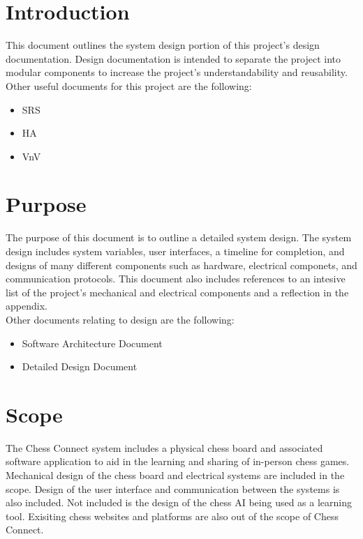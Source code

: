 \documentclass[12pt, titlepage]{article}
\begin{document}
\section{Introduction}
This document outlines the system design portion of this project's design documentation. Design documentation 
is intended to separate the project into modular components to increase the project's understandability and reusability. \\
Other useful documents for this project are the following:
\begin{itemize}
  \item SRS
  \item HA
  \item VnV
\end{itemize}

\section{Purpose}
The purpose of this document is to outline a detailed system design. The system design includes system variables, user interfaces, a timeline for completion, and designs of many 
different components such as hardware, electrical componets, and communication protocols. This document also includes references to an intesive list of the project's
mechanical and electrical components and a reflection in the appendix. \\
Other documents relating to design are the following:
\begin{itemize}
  \item Software Architecture Document
  \item Detailed Design Document
\end{itemize}
\section{Scope}
The Chess Connect system includes a physical chess board and associated software 
application to aid in the learning and sharing of in-person chess games. 
Mechanical design of the chess board and electrical systems are included in the 
scope. Design of the user interface and communication between the systems is also
included. 
Not included is the design of the chess AI being used as a learning tool. Exisiting
chess websites and platforms are also out of the scope of Chess Connect.
\end{document}
